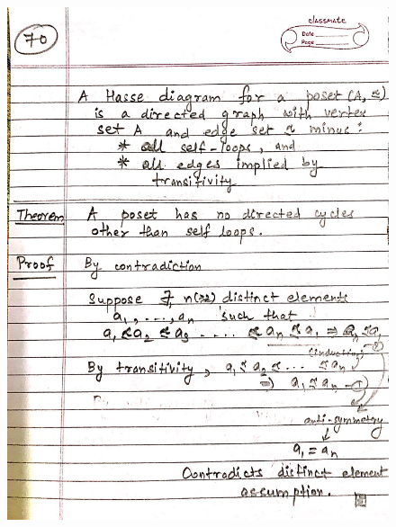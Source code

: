 \begin{figure}[H]
    \centering
    \includegraphics[width=16cm, height=21cm]{"./MIT-6.042J/MIT-6042J-070"}
\end{figure}
\newpage
